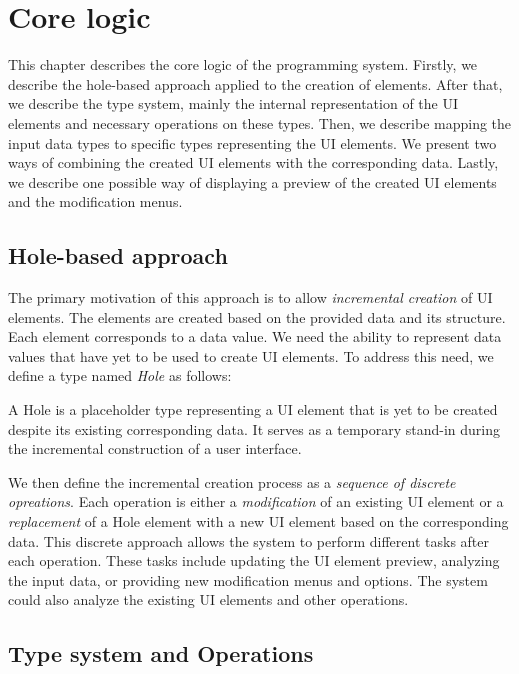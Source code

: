 \chapter{Core logic}
\label{chap:corelogic}

This chapter describes the core logic of the programming system.
Firstly, we describe the hole-based approach applied to the creation of elements.
After that, we describe the type system, mainly the internal representation of the UI elements and necessary operations on these types.
Then, we describe mapping the input data types to specific types representing the UI elements.
We present two ways of combining the created UI elements with the corresponding data.
Lastly, we describe one possible way of displaying a preview of the created UI elements and the modification menus.

\section{Hole-based approach}
\label{sec:hole-based}
The primary motivation of this approach is to allow \emph{incremental creation} of UI elements.
The elements are created based on the provided data and its structure.
Each element corresponds to a data value.
We need the ability to represent data values that have yet to be used to create UI elements.
To address this need, we define a type named \emph{Hole} as follows:
\begin{defn}
	A Hole is a placeholder type representing a UI element that is yet to be created despite its existing corresponding data. It serves as a temporary stand-in during the incremental construction of a user interface.
\end{defn}

We then define the incremental creation process as a \emph{sequence of discrete opreations}.
Each operation is either a \emph{modification} of an existing UI element or a \emph{replacement} of a Hole element with a new UI element based on the corresponding data.
This discrete approach allows the system to perform different tasks after each operation.
These tasks include updating the UI element preview, analyzing the input data, or providing new modification menus and options.
The system could also analyze the existing UI elements and other operations.


\section{Type system and Operations}

